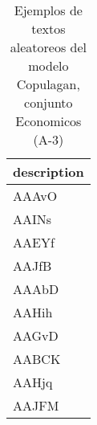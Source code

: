 \begin{table}[H]
\centering
\fontsize{8}{14}\selectfont
\caption{Ejemplos de textos aleatoreos del modelo Copulagan, conjunto Economicos (A-3)}
\label{table-sample10-economicos-a-3-copulagan-text}
\begin{tabular}{|m{50em}|}
\hline
\rowcolor[gray]{0.8}
description \\
\hline AAAvO \\
\hline AAINs \\
\hline AAEYf \\
\hline AAJfB \\
\hline AAAbD \\
\hline AAHih \\
\hline AAGvD \\
\hline AABCK \\
\hline AAHjq \\
\hline AAJFM \\
\hline
\end{tabular}
\end{table}
